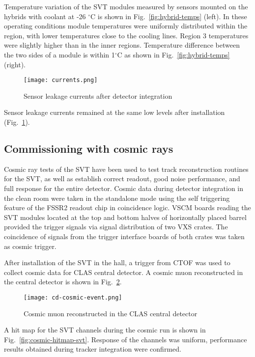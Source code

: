 Temperature variation of the SVT modules measured by sensors mounted on the hybrids with coolant at -26 $^\circ$C is shown in Fig.~\ref{fig:hybrid-temps} (left). In these operating conditions module temperatures were uniformly distributed within the region, with lower temperatures close to the cooling lines. Region 3 temperatures were slightly higher than in the inner regions. Temperature difference between the two sides of a module is within 1$^\circ$C as shown in Fig.~\ref{fig:hybrid-temps} (right). 

\begin{figure}[hbt] 
\centering 
\texttt{[image: currents.png]}
\caption{Sensor leakage currents after detector integration}
\label{fig:currents}
\end{figure}

Sensor leakage currents remained at the same low levels after installation (Fig.~\ref{fig:currents}).

\subsection{Commissioning with cosmic rays}

Cosmic ray tests of the SVT have been used to test track reconstruction routines for the SVT, as well as establish correct readout, good noise performance, and full response for the entire detector. Cosmic data during detector integration in the clean room were taken in the standalone mode using the self triggering feature of the FSSR2 readout chip in coincidence logic. VSCM boards reading the SVT modules located at the top and bottom halves of horizontally placed barrel provided the trigger signals via signal distribution of two VXS crates. The coincidence of  signals from the trigger interface boards of both crates was taken as cosmic trigger. 


After installation of the SVT in the hall, a trigger from CTOF was used to collect cosmic data for CLAS central detector. A cosmic muon reconstructed in the central detector is shown in Fig.~\ref{fig:cd-cosmic-event}.

\begin{figure}[hbt] 
\centering 
\texttt{[image: cd-cosmic-event.png]}
\caption{Cosmic muon reconstructed in the CLAS central detector}
\label{fig:cd-cosmic-event}
\end{figure}

A hit map for the SVT channels during the cosmic run is shown in Fig.~\ref{fig:cosmic-hitmap-svt}. Response of the channels was uniform, performance results obtained during tracker integration were confirmed.

